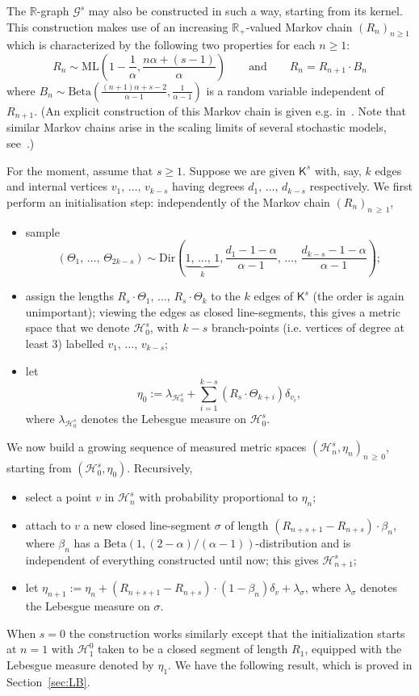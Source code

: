 \documentclass[10pt]{amsart}
\theoremstyle{definition}\newtheorem{defi}[theo]{Definition}\newtheorem{rema}[theo]{Remark}\newtheorem{exam}[theo]{Example}\newtheorem{exem}[theo]{Example}\newtheorem{nota}[theo]{Notation}
\newcommand{\Betal}{\mathrm{Beta}}
\newcommand{\ML}{\mathrm{ML}}
\newcommand{\Dir}{\mathrm{Dir}}
\newcommand{\cG}{\mathcal{G}}
\newcommand{\cH}{\mathcal{H}}
\newcommand{\sK}{\mathsf{K}}
\newcommand{\R}{\mathbb{R}}
\begin{document}
The $\R$-graph $\cG^s$ may also be constructed in such a way, starting from its kernel. This construction makes use of an increasing $\R_+$-valued Markov chain $(R_n)_{n \geq 1}$ which is characterized by the following two properties for each $n \geq 1$:
\[
R_n \sim \ML\left(1-\frac{1}{\alpha},\frac{n\alpha+(s-1)}{\alpha}\right) \quad \quad \text{and} \quad \quad R_n=R_{n+1} \cdot B_n
\]
where $B_n \sim \Betal(\frac{(n+1)\alpha+s-2}{\alpha-1},\frac{1}{\alpha-1})$ is a random variable independent of $R_{n+1}$. (An explicit construction of this Markov chain is given e.g. in~\cite[Section~1.2]{GHlinebreaking}. Note that similar Markov chains arise in the scaling limits of several stochastic models, see~\cite{Lancelot15, Sen19+_geometry}.)

For the moment, assume that $s\geq 1$. Suppose we are given $\sK^s$ with, say, $k$ edges and internal vertices $v_1,\,\ldots,\,v_{k-s}$ having degrees $d_1,\,\ldots,\,d_{k-s}$ respectively. We first perform an initialisation step: independently of the Markov chain $(R_n)_{n\,\geq\,1}$,
\begin{itemize}
\item sample
\[
\left(\Theta_1,\,\ldots,\,\Theta_{2k-s}\right) \sim \Dir\left(\underbrace{1,\,\ldots,\,1}_k,\frac{d_1-1-\alpha}{\alpha-1},\,\ldots,\,\frac{d_{k-s}-1-\alpha}{\alpha-1}\right);
\]
\item assign the lengths $R_s\cdot \Theta_1,\,\ldots,\,R_s \cdot \Theta_k$ to the $k$ edges of $\sK^s$ (the order is again unimportant); viewing the edges as closed line-segments, this gives a metric space that we denote $\cH^s_0$, with $k-s$ branch-points (i.e. vertices of degree at least 3) labelled $v_1,\,\ldots,\,v_{k-s}$;
\item let
\[
\eta_0:=\lambda_{\cH^s_0}+\sum_{i=1}^{k-s}\left(R_s \cdot \Theta_{k+i}\right)\delta_{v_i},
\]
where $\lambda_{\cH^s_0}$ denotes the Lebesgue measure on $\cH^s_0$.
\end{itemize}

We now build a growing sequence of measured metric spaces $(\cH^s_{n},\eta_n)_{n\,\geq\,0}$, starting from $(\cH^s_{0},\eta_0)$. Recursively,
\begin{itemize}
\item select a point $v$ in $\cH^s_{n}$ with probability proportional to $\eta_n$;
\item attach to $v$ a new closed line-segment $\sigma$ of length $(R_{n+s+1}-R_{n+s}) \cdot \beta_n$, where $\beta_n$ has a $\Betal(1,(2-\alpha)/(\alpha-1))$-distribution and is independent of everything constructed until now; this gives $\cH_{n+1}^s$;
\item let $\eta_{n+1}:=\eta_n+ (R_{n+s+1}-R_{n+s}) \cdot (1-\beta_n) \delta_{v}+\lambda_{\sigma}$, where $\lambda_{\sigma}$ denotes the Lebesgue measure on $\sigma$.
\end{itemize}
When $s=0$ the construction works similarly except that the initialization starts at $n=1$ with $\cH^0_1$ taken to be a closed segment of length $R_1$, equipped with the Lebesgue measure denoted by $\eta_1$. We have the following result, which is proved in Section~\ref{sec:LB}.
\end{document}

